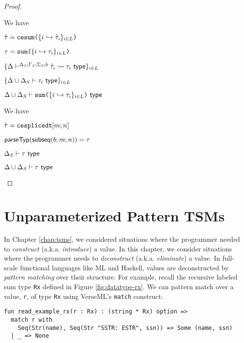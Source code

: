\begin{proof}
\begin{byCases}
\item[\text{(\ref{rule:cvalidT-U-sum})}] We have
\begin{pfsteps*}
\item $\grave{\tau}=\texttt{cesum}\texttt{(}\{i \hookrightarrow \grave{\tau}_{i}\}_{i \in L}\texttt{)}$   
\item $\tau=\texttt{sum}\texttt{(}\{i \hookrightarrow \tau_{i}\}_{i \in L}\texttt{)}$ 
\item $\{\Delta\vdash^{\Delta_S; \Gamma_S; \Sigma_S; b} \grave{\tau}_i \leadsto \tau_i~\mathsf{type}\}_{i \in L}$  
\item $\{\Delta \cup \Delta_S \vdash \tau_i~\mathsf{type}\}_{i \in L}$  
\item $\Delta \cup \Delta_S \vdash \texttt{sum}\texttt{(}\{i \hookrightarrow \tau_{i}\}_{i \in L}\texttt{)}~\mathsf{type}$ 
\end{pfsteps*}
\resetpfcounter

\item[\text{(\ref{rule:cvalidT-U-splicedt})}] We have
\begin{pfsteps*}
\item $\grave{\tau}=\texttt{cesplicedt}[m; n]$ 
\item $\mathsf{parseTyp}(\mathsf{subseq}(b; m; n))=\tau$ 
\item $\Delta_S \vdash \tau~\mathsf{type}$ 
\item $\Delta \cup \Delta_S \vdash \tau~\mathsf{type}$ 
\end{pfsteps*}
\end{byCases}
\end{proof}

\chapter{Unparameterized Pattern TSMs}\label{sec:pattern-tsms}
In Chapter \ref{chap:tsms}, we considered situations where the programmer needed to \emph{construct} (a.k.a. \emph{introduce}) a value. In this chapter, we consider situations where the programmer needs to \emph{deconstruct} (a.k.a. \emph{eliminate}) a value. In full-scale functional languages like ML and Haskell, values are deconstructed by \emph{pattern matching} over their structure. For example, recall the recursive labeled sum type \lstinline{Rx} defined in Figure \ref{fig:datatype-rx}. We can pattern match over a value, \lstinline{r}, of type \lstinline{Rx} using VerseML's \lstinline{match} construct:
\begin{lstlisting}
fun read_example_rx(r : Rx) : (string * Rx) option => 
  match r with 
    Seq(Str(name), Seq(Str "SSTR: ESTR", ssn)) => Some (name, ssn)
  | _ => None
\end{lstlisting}

